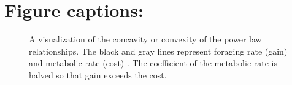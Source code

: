\section*{Figure captions:}
\begin{figure}[H]
\begin{center}
\caption{
	A visualization of the concavity or convexity of the power law relationships.
	The black and gray lines represent foraging rate (gain) and  metabolic rate (cost) .
	The coefficient of the metabolic rate is halved so that gain exceeds the cost.
}
\label{fig1}
\end{center}
\end{figure}
%
